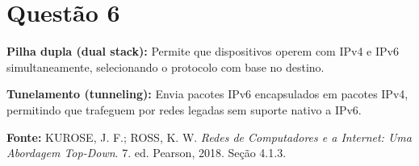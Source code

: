 \documentclass[12pt]{article}
\begin{document}
\section*{Questão 6}

\textbf{Pilha dupla (dual stack):} Permite que dispositivos operem com IPv4 e IPv6 simultaneamente, selecionando o protocolo com base no destino.

\textbf{Tunelamento (tunneling):} Envia pacotes IPv6 encapsulados em pacotes IPv4, permitindo que trafeguem por redes legadas sem suporte nativo a IPv6.

\textbf{Fonte:} KUROSE, J. F.; ROSS, K. W. \textit{Redes de Computadores e a Internet: Uma Abordagem Top-Down}. 7. ed. Pearson, 2018. Seção 4.1.3.
\end{document}

